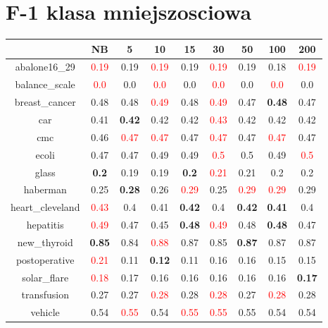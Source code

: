\documentclass{article}%
\begin{document}
\section*{F{-}1 klasa mniejszosciowa}%
\begin{tabular}{c|cccccccc}%
\hline%
&NB&5&10&15&30&50&100&200\\%
\hline%
abalone16\_29&\textcolor{red}{ 
0.19
}&0.19&\textcolor{red}{ 
0.19
}&0.19&\textcolor{red}{ 
0.19
}&0.19&0.18&\textcolor{red}{ 
0.19
}\\%
\hline%
balance\_scale&\textcolor{red}{ 
0.0
}&0.0&\textcolor{red}{ 
0.0
}&0.0&\textcolor{red}{ 
0.0
}&0.0&\textcolor{red}{ 
0.0
}&0.0\\%
\hline%
breast\_cancer&0.48&0.48&\textcolor{red}{ 
0.49
}&0.48&\textcolor{red}{ 
0.49
}&0.47&\textbf{0.48}&0.47\\%
\hline%
car&0.41&\textbf{0.42}&0.42&0.42&\textcolor{red}{ 
0.43
}&0.42&0.42&0.42\\%
\hline%
cmc&0.46&\textcolor{red}{ 
0.47
}&\textcolor{red}{ 
0.47
}&0.47&\textcolor{red}{ 
0.47
}&0.47&\textcolor{red}{ 
0.47
}&0.47\\%
\hline%
ecoli&0.47&0.47&0.49&0.49&\textcolor{red}{ 
0.5
}&0.5&0.49&\textcolor{red}{ 
0.5
}\\%
\hline%
glass&\textbf{0.2}&0.19&0.19&\textbf{0.2}&\textcolor{red}{ 
0.21
}&0.21&0.2&0.2\\%
\hline%
haberman&0.25&\textbf{0.28}&0.26&\textcolor{red}{ 
0.29
}&0.25&\textcolor{red}{ 
0.29
}&\textcolor{red}{ 
0.29
}&0.29\\%
\hline%
heart\_cleveland&\textcolor{red}{ 
0.43
}&0.4&0.41&\textbf{0.42}&0.4&\textbf{0.42}&\textbf{0.41}&0.4\\%
\hline%
hepatitis&\textcolor{red}{ 
0.49
}&0.47&0.45&\textbf{0.48}&\textcolor{red}{ 
0.49
}&0.48&\textbf{0.48}&0.47\\%
\hline%
new\_thyroid&\textbf{0.85}&0.84&\textcolor{red}{ 
0.88
}&0.87&0.85&\textbf{0.87}&0.87&0.87\\%
\hline%
postoperative&\textcolor{red}{ 
0.21
}&0.11&\textbf{0.12}&0.11&0.16&0.16&0.15&0.15\\%
\hline%
solar\_flare&\textcolor{red}{ 
0.18
}&0.17&0.16&0.16&0.16&0.16&0.16&\textbf{0.17}\\%
\hline%
transfusion&0.27&0.27&\textcolor{red}{ 
0.28
}&0.28&\textcolor{red}{ 
0.28
}&0.27&\textcolor{red}{ 
0.28
}&0.28\\%
\hline%
vehicle&0.54&\textcolor{red}{ 
0.55
}&0.54&\textcolor{red}{ 
0.55
}&\textcolor{red}{ 
0.55
}&0.55&0.54&0.54\\%

\end{tabular}
\end{document}
